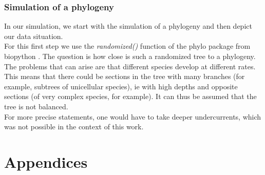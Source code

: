     \subsection{Simulation of a phylogeny} \label{sec:discussion - simulate phylogeny}
      In our simulation, we start with the simulation of a phylogeny and then depict our data situation. \\
      For this first step we use the \textit{randomized()} function of the phylo package from biopython
        \cite{Cock2009}. The question is how close is such a randomized tree to a phylogeny. \\
      
      The problems that can arise are that different species develop at different rates. This means that 
        there could be sections in the tree with many branches (for example, subtrees of unicellular 
        species), ie with high depths and opposite sections (of very complex species, for example). It 
        can thus be assumed that the tree is not balanced. \\
      For more precise statements, one would have to take deeper undercurrents, which was not possible 
        in the context of this work.
  


\chapter{Appendices}
